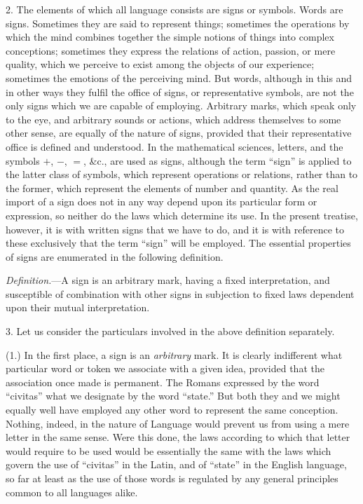 \documentclass[oneside]{book}
\begin{document}
2. The elements of which all language consists are signs or
symbols. Words are signs. Sometimes they are said to represent
things; sometimes the operations by which the mind combines
together the simple notions of things into complex conceptions;
sometimes they express the relations of action, passion, or
mere quality, which we perceive to exist among the objects of our
experience; sometimes the emotions of the perceiving mind. But
words, although in this and in other ways they fulfil the office of
signs, or representative symbols, are not the only signs which we
are capable of employing. Arbitrary marks, which speak only to
the eye, and arbitrary sounds or actions, which address themselves
to some other sense, are equally of the nature of signs, provided
that their representative office is defined and understood. In the
mathematical sciences, letters, and the symbols $+$, $-$, $=$, \&c., are
used as signs, although the term ``sign'' is applied to the latter
class of symbols, which represent operations or relations, rather
than to the former, which represent the elements of number and
quantity. As the real import of a sign does not in any way depend
upon its particular form or expression, so neither do the
laws which determine its use. In the present treatise, however,
it is with written signs that we have to do, and it is with reference
to these exclusively that the term ``sign'' will be employed. The
essential properties of signs are enumerated in the following definition.

\textit{Definition.}---A sign is an arbitrary mark, having a fixed interpretation,
and susceptible of combination with other signs in
subjection to fixed laws dependent upon their mutual interpretation.

3. Let us consider the particulars involved in the above definition
separately.

(1.) In the first place, a sign is an \textit{arbitrary} mark. It is
clearly indifferent what particular word or token we associate
with a given idea, provided that the association once made is
permanent. The Romans expressed by the word ``civitas'' what
we designate by the word ``state.'' But both they and we
might equally well have employed any other word to represent
the same conception. Nothing, indeed, in the nature of Language
would prevent us from using a mere letter in the same sense.
Were this done, the laws according to which that letter would
require to be used would be essentially the same with the laws
which govern the use of ``civitas'' in the Latin, and of ``state''
in the English language, so far at least as the use of those words
is regulated by any general principles common to all languages
alike.
\end{document}
